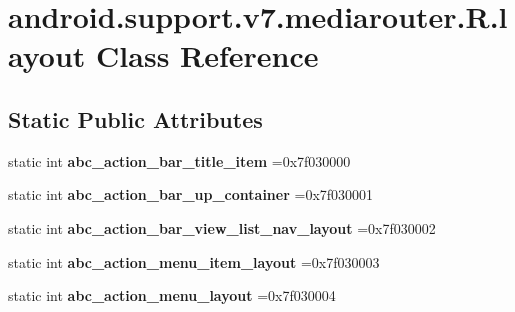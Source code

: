 \hypertarget{classandroid_1_1support_1_1v7_1_1mediarouter_1_1R_1_1layout}{}\section{android.\+support.\+v7.\+mediarouter.\+R.\+layout Class Reference}
\label{classandroid_1_1support_1_1v7_1_1mediarouter_1_1R_1_1layout}
\subsection*{Static Public Attributes}
\begin{DoxyCompactItemize}
\item 
\mbox{\label{classandroid_1_1support_1_1v7_1_1mediarouter_1_1R_1_1layout_afc0acc7858ec7cefc09f08b81b45f46a}} 
static int {\bfseries abc\+\_\+action\+\_\+bar\+\_\+title\+\_\+item} =0x7f030000
\item 
\mbox{\label{classandroid_1_1support_1_1v7_1_1mediarouter_1_1R_1_1layout_acfd35cbd560250e95b3739cd7531753f}} 
static int {\bfseries abc\+\_\+action\+\_\+bar\+\_\+up\+\_\+container} =0x7f030001
\item 
\mbox{\label{classandroid_1_1support_1_1v7_1_1mediarouter_1_1R_1_1layout_a021648099ef662d8da8b8e9604482b16}} 
static int {\bfseries abc\+\_\+action\+\_\+bar\+\_\+view\+\_\+list\+\_\+nav\+\_\+layout} =0x7f030002
\item 
\mbox{\label{classandroid_1_1support_1_1v7_1_1mediarouter_1_1R_1_1layout_a5deed6fff615f9c660ab3314383f76a7}} 
static int {\bfseries abc\+\_\+action\+\_\+menu\+\_\+item\+\_\+layout} =0x7f030003
\item 
\mbox{\label{classandroid_1_1support_1_1v7_1_1mediarouter_1_1R_1_1layout_a708e1ad794f94f63cbc8f82cd84f391f}} 
static int {\bfseries abc\+\_\+action\+\_\+menu\+\_\+layout} =0x7f030004
\item 
\mbox{\label{classandroid_1_1support_1_1v7_1_1mediarouter_1_1R_1_1layout_aa55ab00dca84c4dd552df7c99b6efe74}} 

\end{DoxyCompactItemize}
